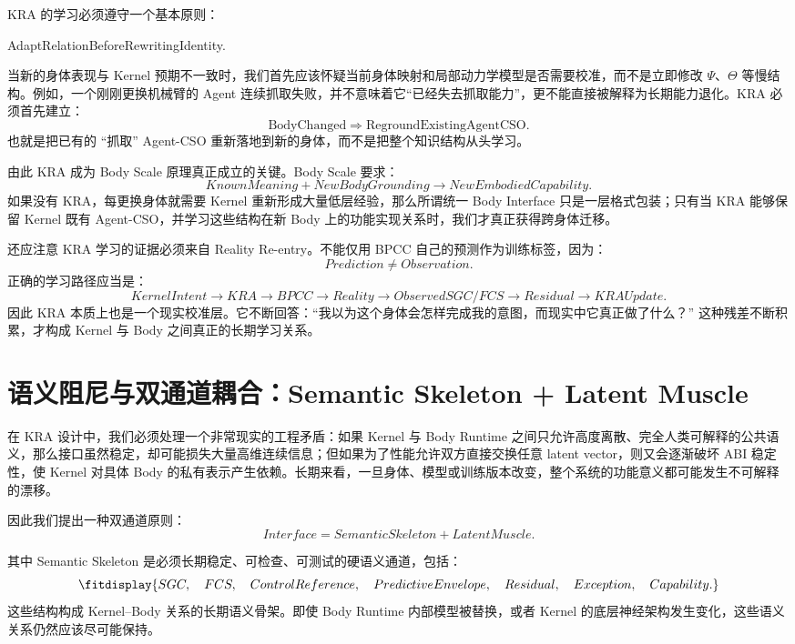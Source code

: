 KRA 的学习必须遵守一个基本原则：
\begin{statementbox}
AdaptRelationBeforeRewritingIdentity.
\end{statementbox}
当新的身体表现与 Kernel 预期不一致时，我们首先应该怀疑当前身体映射和局部动力学模型是否需要校准，而不是立即修改 $\Psi$、$\Theta$ 等慢结构。例如，一个刚刚更换机械臂的 Agent 连续抓取失败，并不意味着它``已经失去抓取能力''，更不能直接被解释为长期能力退化。KRA 必须首先建立：
\[
\mathrm{BodyChanged}
\Rightarrow
\mathrm{RegroundExistingAgentCSO}.
\]
也就是把已有的 ``抓取'' Agent-CSO 重新落地到新的身体，而不是把整个知识结构从头学习。

由此 KRA 成为 Body Scale 原理真正成立的关键。Body Scale 要求：
\[
KnownMeaning
+
NewBodyGrounding
\rightarrow
NewEmbodiedCapability.
\]
如果没有 KRA，每更换身体就需要 Kernel 重新形成大量低层经验，那么所谓统一 Body Interface 只是一层格式包装；只有当 KRA 能够保留 Kernel 既有 Agent-CSO，并学习这些结构在新 Body 上的功能实现关系时，我们才真正获得跨身体迁移。

还应注意 KRA 学习的证据必须来自 Reality Re-entry。不能仅用 BPCC 自己的预测作为训练标签，因为：
\[
\boxed{
Prediction\neq Observation.
}
\]
正确的学习路径应当是：
\[
KernelIntent
\rightarrow
KRA
\rightarrow
BPCC
\rightarrow
Reality
\rightarrow
ObservedSGC/FCS
\rightarrow
Residual
\rightarrow
KRAUpdate.
\]
因此 KRA 本质上也是一个现实校准层。它不断回答：``我以为这个身体会怎样完成我的意图，而现实中它真正做了什么？'' 这种残差不断积累，才构成 Kernel 与 Body 之间真正的长期学习关系。

\section{语义阻尼与双通道耦合：Semantic Skeleton + Latent Muscle}
\label{sec:kra-semantic-damping}

在 KRA 设计中，我们必须处理一个非常现实的工程矛盾：如果 Kernel 与 Body Runtime 之间只允许高度离散、完全人类可解释的公共语义，那么接口虽然稳定，却可能损失大量高维连续信息；但如果为了性能允许双方直接交换任意 latent vector，则又会逐渐破坏 ABI 稳定性，使 Kernel 对具体 Body 的私有表示产生依赖。长期来看，一旦身体、模型或训练版本改变，整个系统的功能意义都可能发生不可解释的漂移。

因此我们提出一种双通道原则：
\[
\boxed{
Interface
=
SemanticSkeleton
+
LatentMuscle.
}
\]

其中 Semantic Skeleton 是必须长期稳定、可检查、可测试的硬语义通道，包括：
\[
\fitdisplay{
SGC,\quad
FCS,\quad
ControlReference,\quad
PredictiveEnvelope,\quad
Residual,\quad
Exception,\quad
Capability.
}
\]
这些结构构成 Kernel--Body 关系的长期语义骨架。即使 Body Runtime 内部模型被替换，或者 Kernel 的底层神经架构发生变化，这些语义关系仍然应该尽可能保持。

